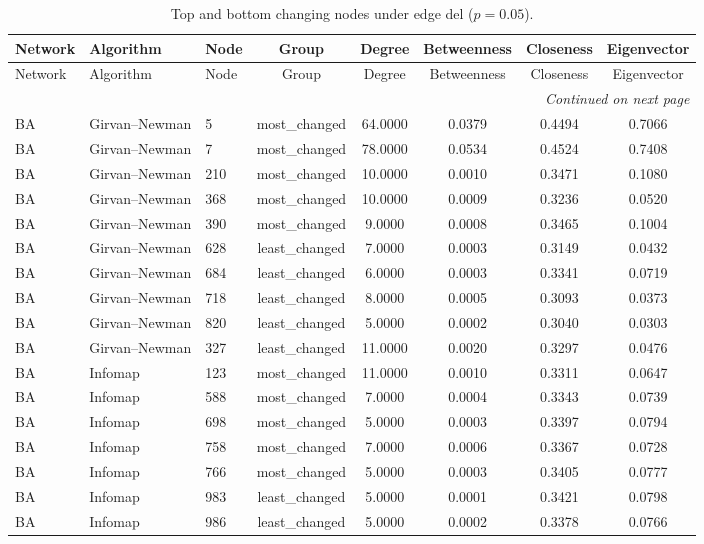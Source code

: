 \begin{longtable}{lllccccc}
\caption{Top and bottom changing nodes under edge del ($p=0.05$).}\label{tab:node_del_p005}\\
\toprule
Network & Algorithm & Node & Group & Degree & Betweenness & Closeness & Eigenvector \\
\midrule
\endfirsthead
\toprule
Network & Algorithm & Node & Group & Degree & Betweenness & Closeness & Eigenvector \\
\midrule
\endhead
\midrule
\multicolumn{8}{r}{\emph{Continued on next page}} \\
\endfoot
\bottomrule
\endlastfoot
BA & Girvan--Newman & 5 & most\_changed & 64.0000 & 0.0379 & 0.4494 & 0.7066 \\
BA & Girvan--Newman & 7 & most\_changed & 78.0000 & 0.0534 & 0.4524 & 0.7408 \\
BA & Girvan--Newman & 210 & most\_changed & 10.0000 & 0.0010 & 0.3471 & 0.1080 \\
BA & Girvan--Newman & 368 & most\_changed & 10.0000 & 0.0009 & 0.3236 & 0.0520 \\
BA & Girvan--Newman & 390 & most\_changed & 9.0000 & 0.0008 & 0.3465 & 0.1004 \\
BA & Girvan--Newman & 628 & least\_changed & 7.0000 & 0.0003 & 0.3149 & 0.0432 \\
BA & Girvan--Newman & 684 & least\_changed & 6.0000 & 0.0003 & 0.3341 & 0.0719 \\
BA & Girvan--Newman & 718 & least\_changed & 8.0000 & 0.0005 & 0.3093 & 0.0373 \\
BA & Girvan--Newman & 820 & least\_changed & 5.0000 & 0.0002 & 0.3040 & 0.0303 \\
BA & Girvan--Newman & 327 & least\_changed & 11.0000 & 0.0020 & 0.3297 & 0.0476 \\
BA & Infomap & 123 & most\_changed & 11.0000 & 0.0010 & 0.3311 & 0.0647 \\
BA & Infomap & 588 & most\_changed & 7.0000 & 0.0004 & 0.3343 & 0.0739 \\
BA & Infomap & 698 & most\_changed & 5.0000 & 0.0003 & 0.3397 & 0.0794 \\
BA & Infomap & 758 & most\_changed & 7.0000 & 0.0006 & 0.3367 & 0.0728 \\
BA & Infomap & 766 & most\_changed & 5.0000 & 0.0003 & 0.3405 & 0.0777 \\
BA & Infomap & 983 & least\_changed & 5.0000 & 0.0001 & 0.3421 & 0.0798 \\
BA & Infomap & 986 & least\_changed & 5.0000 & 0.0002 & 0.3378 & 0.0766 \\

\end{longtable}
